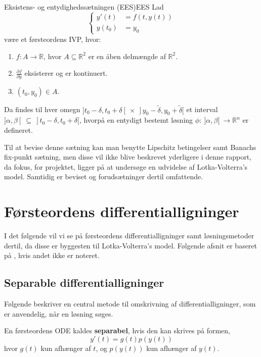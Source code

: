 \begin{mytheo}{Eksistens- og entydighedssætningen (EES)}{EES}
Lad 
\begin{equation*}
    \begin{cases}
      y'(t)&=f(t,y(t))\\
      y(t_0)&=y_0
    \end{cases}
\end{equation*}
være et førsteordens IVP, hvor: 

\begin{enumerate}
    \item $f: A \rightarrow \mathbb{R}$, hvor $A\subseteq \mathbb{R}^2$ er en åben delmængde af $\mathbb{R}^2$.
    \item $\frac{\partial f}{\partial y}$ eksisterer og er kontinuert.
    \item $(t_0,y_0) \in A$.
\end{enumerate}
Da findes til hver omegn $]t_0-\delta,t_0+\delta[ \ \times \ ]y_0-\tilde{\delta},y_0+\tilde{\delta}[$ et interval $]\alpha,\beta[ \ \subseteq \ ]t_0-\delta,t_0+\delta[$, hvorpå en entydigt bestemt løsning $\phi\colon \ ]\alpha,\beta[ \ \to \mathbb{R}^n$ er defineret.
\end{mytheo}

Til at bevise denne sætning kan man benytte Lipschitz betingelser samt Banachs fix-punkt sætning, men disse vil ikke blive beskrevet yderligere i denne rapport, da fokus, for projektet, ligger på at undersøge en udvidelse af Lotka-Volterra's model. Samtidig er beviset og forudsætninger dertil omfattende.

\section{Førsteordens differentialligninger}
I det følgende vil vi se på førsteordens differentialligninger samt løsningsmetoder dertil, da disse er byggesten til Lotka-Volterra's model.
Følgende afsnit er baseret på \citep[kapitel 2.2]{JAB}, hvis andet ikke er noteret.
\subsection{Separable differentialligninger}
Følgende beskriver en central metode til omskrivning af differentialligninger, som er anvendelig, når en løsning søges.
\begin{definition}
En førsteordens ODE kaldes \textbf{separabel}, hvis den kan skrives på formen, $$y'(t)=g(t)p(y(t))$$ hvor $g(t)$ kun afhænger af $t$, og $p(y(t))$ kun afhænger af $y(t)$.
\end{definition}

